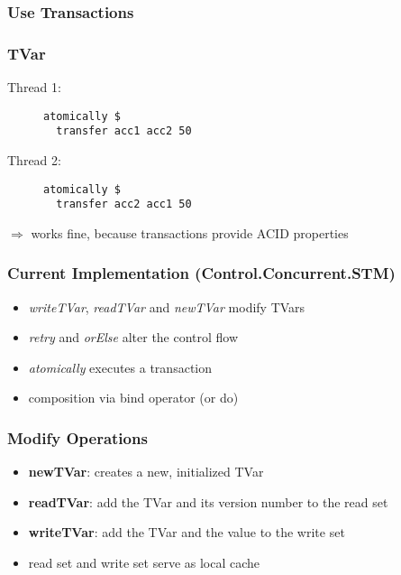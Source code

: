 \documentclass{beamer}
\begin{document}
  \begin{frame}
    \frametitle{Use Transactions}
       
  \end{frame}
  
  \begin{frame}[fragile]
    \frametitle{TVar}
    \fboxsep=0pt
    \noindent
    \begin{minipage}[t]{0.48\linewidth}
      Thread 1:
      \begin{figure}
       \begin{lstlisting}[frame=single]
atomically $ 
  transfer acc1 acc2 50
       \end{lstlisting}
      \end{figure}
    \end{minipage}%
    \hfill%
    \begin{minipage}[t]{0.48\linewidth}
      Thread 2:
      \begin{figure}
       \begin{lstlisting}[frame=single]
atomically $ 
  transfer acc2 acc1 50
       \end{lstlisting}
      \end{figure}
    \end{minipage}
    \vfill
    \pause
    $\Rightarrow$ works fine, because transactions provide ACID properties
\end{frame}
  \begin{frame}
    \frametitle{Current Implementation (Control.Concurrent.STM)}
    \begin{itemize}\setlength\itemsep{1em}
      \item \textit{writeTVar}, \textit{readTVar} and \textit{newTVar} modify TVars
      \item \textit{retry} and \textit{orElse} alter the control flow
      \item \textit{atomically} executes a transaction 
      \item composition via bind operator (or do)
    \end{itemize}
  \end{frame}
  
  \begin{frame}
   \frametitle{Modify Operations}
   \begin{itemize}\setlength\itemsep{1em}
    \item \textbf{newTVar}: creates a new, initialized TVar 
    \item \textbf{readTVar}: add the TVar and its version number to the read set
    \item \textbf{writeTVar}: add the TVar and the value to the write set
    \item read set and write set serve as local cache 
  \end{itemize}
  \end{frame}
  
\end{document}
